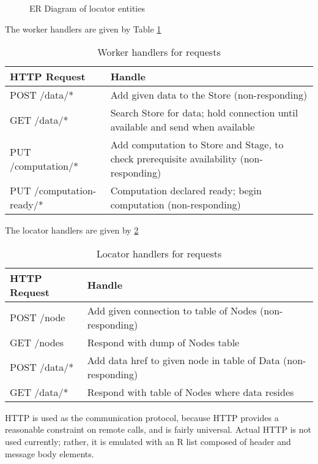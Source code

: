 \begin{figure}

\caption{ER Diagram of locator entities}
\label{fig:locatordb}
\end{figure}

The worker handlers are given by Table \cref{tbl:whandler}

\begin{table}[]
\caption{Worker handlers for requests}
\label{tbl:whandler}
\begin{tabular}{@{}ll@{}}
\toprule
HTTP Request             & Handle                                                                         \\ \midrule
POST /data/*             & Add given data to the Store (non-responding)                                   \\
GET /data/*              & Search Store for data; hold connection until available and send when available \\
PUT /computation/* & Add computation to Store and Stage, to check prerequisite availability (non-responding) \\
PUT /computation-ready/* & Computation declared ready; begin computation (non-responding)                 \\ \bottomrule
\end{tabular}
\end{table}

The locator handlers are given by \cref{tbl:lhandler}

\begin{table}[]
\caption{Locator handlers for requests}
\label{tbl:lhandler}
\begin{tabular}{@{}ll@{}}
\toprule
HTTP Request & Handle                                                        \\ \midrule
POST /node   & Add given connection to table of Nodes (non-responding)       \\
GET /nodes   & Respond with dump of Nodes table                              \\
POST /data/* & Add data href to given node in table of Data (non-responding) \\
GET /data/*  & Respond with table of Nodes where data resides                \\ \bottomrule
\end{tabular}
\end{table}

HTTP is used as the communication protocol, because HTTP provides a reasonable constraint on remote calls, and is fairly universal.
Actual HTTP is not used currently; rather, it is emulated with an R list composed of header and message body elements.

